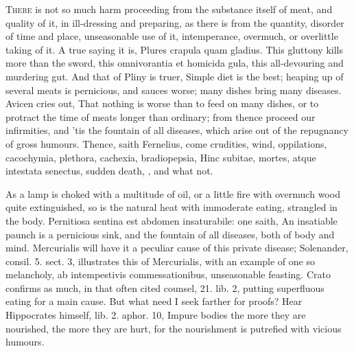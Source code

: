 {{\lettrine{T}{here} is not so much harm proceeding from the substance itself of meat,
and quality of it, in ill-dressing and preparing, as there is from the
quantity, disorder of time and place, unseasonable use of it, 
intemperance, overmuch, or overlittle taking of it. A true saying it
is, Plures crapula quam gladius. This gluttony kills more than the
sword, this omnivorantia et homicida gula, this all-devouring and
murdering gut. And that of Pliny is truer, Simple diet is the
best; heaping up of several meats is pernicious, and sauces worse; many
dishes bring many diseases. Avicen cries out, That nothing is
worse than to feed on many dishes, or to protract the time of meats
longer than ordinary; from thence proceed our infirmities, and 'tis the
fountain of all diseases, which arise out of the repugnancy of gross
humours. Thence, saith  Fernelius, come crudities, wind,
oppilations, cacochymia, plethora, cachexia, bradiopepsia, Hinc
subitae, mortes, atque intestata senectus, sudden death, \etc{}, and what
not.

As a lamp is choked with a multitude of oil, or a little fire with
overmuch wood quite extinguished, so is the natural heat with
immoderate eating, strangled in the body. Pernitiosa sentina est
abdomen insaturabile: one saith, An insatiable paunch is a pernicious
sink, and the fountain of all diseases, both of body and mind.
Mercurialis will have it a peculiar cause of this private
disease; Solenander, consil. 5. sect. 3, illustrates this of
Mercurialis, with an example of one so melancholy, ab intempestivis
commessationibus, unseasonable feasting. Crato confirms as much,
in that often cited counsel, 21. lib. 2, putting superfluous eating for
a main cause. But what need I seek farther for proofs? Hear
Hippocrates himself, lib. 2. aphor. 10, Impure bodies the more
they are nourished, the more they are hurt, for the nourishment is
putrefied with vicious humours.

}}
